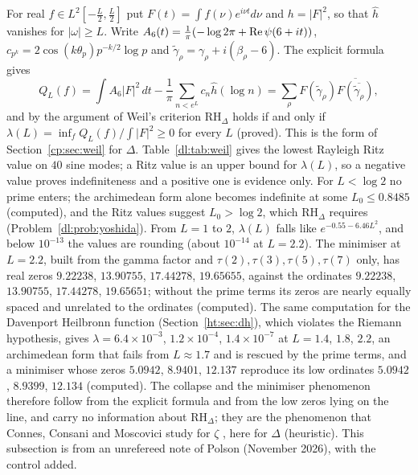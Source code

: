 For real $f\in L^2[-\frac L2,\frac L2]$ put $F(t)=\int f(\nu)e^{i\nu t}d\nu$ and $h=|F|^2$, so that $\hat h$ vanishes for $|\omega|\ge L$. Write $A_6(t)=\frac1\pi(-\log2\pi+\operatorname{Re}\psi(6+it))$, $c_{p^k}=2\cos(k\theta_p)p^{-k/2}\log p$ and $\tilde\gamma_\rho=\gamma_\rho+i(\beta_\rho-6)$. The explicit formula gives
\[Q_L(f)=\int A_6|F|^2\,dt-\frac1\pi\sum_{n<e^L}c_n\hat h(\log n)=\sum_\rho F(\tilde\gamma_\rho)\overline{F(\overline{\tilde\gamma_\rho})},\]
and by the argument of Weil's criterion \cite{Weil52} $\mathrm{RH}_\Delta$ holds if and only if $\lambda(L)=\inf_fQ_L(f)/\int|F|^2\ge0$ for every $L$ (proved). This is the form of Section~\ref{cp:sec:weil} for $\Delta$. Table~\ref{dl:tab:weil} gives the lowest Rayleigh Ritz value on $40$ sine modes; a Ritz value is an upper bound for $\lambda(L)$, so a negative value proves indefiniteness and a positive one is evidence only. For $L<\log2$ no prime enters; the archimedean form alone becomes indefinite at some $L_0\le0.8485$ (computed), and the Ritz values suggest $L_0>\log2$, which $\mathrm{RH}_\Delta$ requires (Problem~\ref{dl:prob:yoshida}). From $L=1$ to $2$, $\lambda(L)$ falls like $e^{-0.55-6.46L^2}$, and below $10^{-13}$ the values are rounding (about $10^{-14}$ at $L=2.2$). The minimiser at $L=2.2$, built from the gamma factor and $\tau(2),\tau(3),\tau(5),\tau(7)$ only, has real zeros $9.22238$, $13.90755$, $17.44278$, $19.65655$, against the ordinates $9.22238$, $13.90755$, $17.44278$, $19.65651$; without the prime terms its zeros are nearly equally spaced and unrelated to the ordinates (computed). The same computation for the Davenport Heilbronn function (Section~\ref{ht:sec:dh}), which violates the Riemann hypothesis, gives $\lambda=6.4\times10^{-3}$, $1.2\times10^{-4}$, $1.4\times10^{-7}$ at $L=1.4$, $1.8$, $2.2$, an archimedean form that fails from $L\approx1.7$ and is rescued by the prime terms, and a minimiser whose zeros $5.0942$, $8.9401$, $12.137$ reproduce its low ordinates $5.0942$, $8.9399$, $12.134$ (computed). The collapse and the minimiser phenomenon therefore follow from the explicit formula and from the low zeros lying on the line, and carry no information about $\mathrm{RH}_\Delta$; they are the phenomenon that Connes, Consani and Moscovici study for $\zeta$ \cite{CCM25}, here for $\Delta$ (heuristic). This subsection is from an unrefereed note of Polson (November 2026), with the control added.

